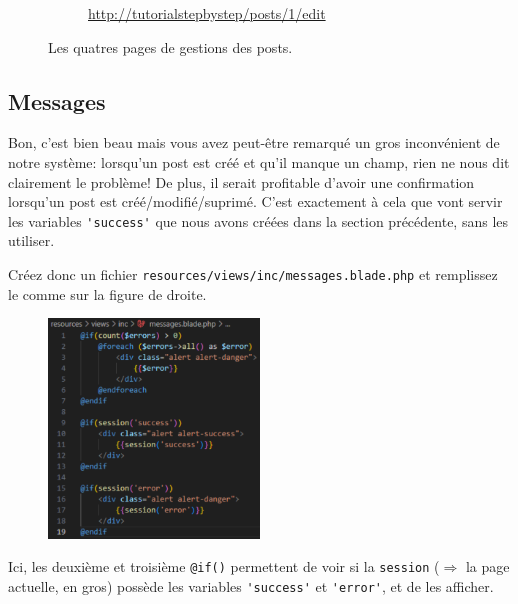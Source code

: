 \documentclass[internal]{nhitec_design}
\begin{document}
\begin{figure}[!h]
\begin{subfigure}[c]{0.24\textwidth}
    \end{subfigure}
    \begin{subfigure}[c]{0.73\textwidth}
    \end{subfigure}\hfill
    \begin{subfigure}[c]{0.24\textwidth}
        \caption{\url{http://tutorialstepbystep/posts/1/edit}}
    \end{subfigure}
    \caption{Les quatres pages de gestions des posts.}
\end{figure}

\newpage

\subsection{Messages}\label{sec:messages}
Bon, c'est bien beau mais vous avez peut-être remarqué un gros inconvénient de notre système: lorsqu'un post est créé et qu'il manque un champ, rien ne nous dit clairement le problème! De plus, il serait profitable d'avoir une confirmation lorsqu'un post est créé/modifié/suprimé. C'est exactement à cela que vont servir les variables \verb|'success'| que nous avons créées dans la section précédente, sans les utiliser.

Créez donc un fichier \verb|resources/views/inc/messages.blade.php| et remplissez le comme sur la figure de droite.

\begin{figure}
    \vspace{-0.5cm}
    \includegraphics[width=0.5\textwidth]{figures-C1/messages_blade.pdf}
\end{figure}
Ici, les deuxième et troisième \verb|@if()| permettent de voir si la \verb|session| ($\Rightarrow$ la page actuelle, en gros) possède les variables \verb|'success'| et \verb|'error'|, et de les afficher. 
\end{document}
